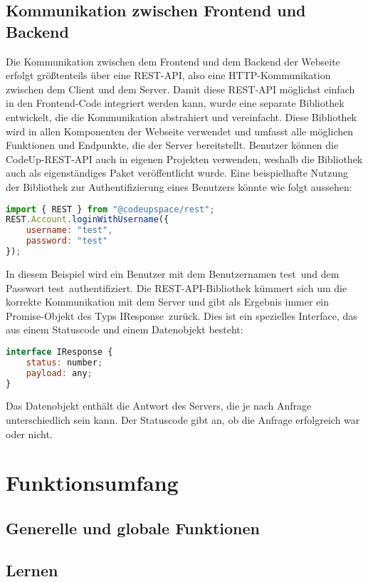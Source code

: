 \documentclass[main.tex]{subfiles}
\begin{document}
    \subsection{Kommunikation zwischen Frontend und Backend}\label{subsec:web_srv_communication}
    Die Kommunikation zwischen dem Frontend und dem Backend der Webseite erfolgt größtenteils über eine REST-API, also eine HTTP-Kommunikation zwischen dem Client und dem Server.
    Damit diese REST-API möglichst einfach in den Frontend-Code integriert werden kann, wurde eine separate Bibliothek entwickelt, die die Kommunikation abstrahiert und vereinfacht.
    Diese Bibliothek wird in allen Komponenten der Webseite verwendet und umfasst alle möglichen Funktionen und Endpunkte, die der Server bereitstellt.
    Benutzer können die CodeUp-REST-API auch in eigenen Projekten verwenden, weshalb die Bibliothek auch als eigenständiges Paket veröffentlicht wurde.
    Eine beispielhafte Nutzung der Bibliothek zur Authentifizierung eines Benutzers könnte wie folgt aussehen:
    \begin{lstlisting}[language=javascript]
import { REST } from "@codeupspace/rest";
REST.Account.loginWithUsername({
    username: "test",
    password: "test"
});
    \end{lstlisting}
    In diesem Beispiel wird ein Benutzer mit dem Benutzernamen \dq test\dq \ und dem Passwort \dq test\dq \ authentifiziert.
    Die REST-API-Bibliothek kümmert sich um die korrekte Kommunikation mit dem Server und gibt als Ergebnis immer ein Promise-Objekt des Typs \dq IResponse\dq\ zurück.
    Dies ist ein spezielles Interface, das aus einem Statuscode und einem Datenobjekt besteht:
    \begin{lstlisting}[language=javascript]
interface IResponse {
    status: number;
    payload: any;
}
    \end{lstlisting}
    Das Datenobjekt enthält die Antwort des Servers, die je nach Anfrage unterschiedlich sein kann.
    Der Statuscode gibt an, ob die Anfrage erfolgreich war oder nicht.

    \section{Funktionsumfang}
    \subsection{Generelle und globale Funktionen}
    \subsection{Lernen}
\end{document}
